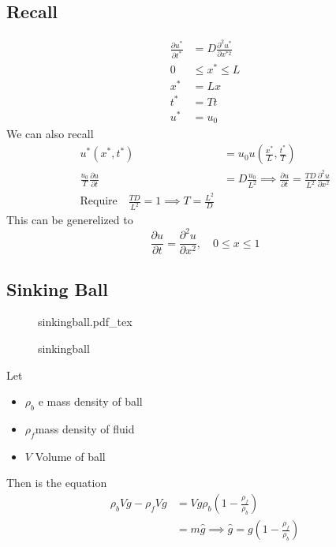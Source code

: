 \documentclass{article}
\newcommand{\incfig}[2][1]{%
\def\svgwidth{#1\columnwidth}
{#2.pdf_tex} } \pdfsuppresswarningpagegroup=1
\theoremstyle{remark}
\begin{document}
\subsection{Recall}%
\label{sub:recall_2}

\[
  \begin{split}
\frac{\partial u^{*}}{\partial t^{*}}   & = D \frac{\partial ^2 u^{*}}{\partial x^{*2} } \\
0 &  \le x^{*} \le L \\
x^{*}  &  = Lx \\
t^{*} &=   Tt \\
u^{*} &=   u_{0}
  \end{split} 
\] 
We can also recall \[
  \begin{split}
u^{*}\left( x^{*} , t^{*}  \right) &=  u_{0} u\left( \frac{x^{*}}{ L} , \frac{t^{*} }{T}  \right) \\
\frac{u_{0}}{T}  \frac{\partial u}{\partial t}  &=  D \frac{u_{0}}{L^2} \implies \frac{\partial u}{\partial t}  = \frac{TD}{L^2}  \frac{\partial ^2 u}{\partial x^2}    \\
\text{Require} \quad  \frac{TD}{L^2}  = 1 \implies  T = \frac{L^2}{D}  
  \end{split} 
\] 
This can be generelized to \[
\frac{\partial u}{\partial t}  = \frac{\partial ^2 u}{\partial x^2}  , \quad  0\le x \le 1 
\] 



\subsection{Sinking Ball}%
\label{sub:sinking_ball}

\begin{figure}[ht]
    \centering
    \incfig{sinkingball}
    \caption{sinkingball}
    \label{fig:sinkingball}
\end{figure}

Let 
\begin{itemize}
  \item $\rho _{b}$ e mass density of ball
  \item $ \rho _{f}$mass density of fluid
  \item $V$ Volume of ball
\end{itemize}

Then is the equation \[
  \begin{split}
\rho _{b} V g - \rho _{f} V g &=  V g \rho _{b} \left( 1- \frac{\rho _{f}}{ \rho _{b}}  \right) \\
&=  m \hat{g} \implies  \hat{g} = g \left( 1 - \frac{\rho _{f}}{ \rho _{b}}  \right)  \\
  \end{split} 
\] 
\end{document}
